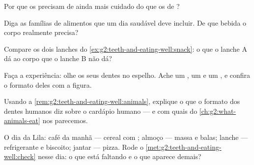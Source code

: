 \begin{exercise}[$\star$]\label{exo:g2:teeth-and-eating-well:5}
Por que os  precisam de ainda mais cuidado do que os
de ?
\end{exercise}

\begin{exercise}[$\star$]\label{exo:g2:teeth-and-eating-well:6}
Diga as famílias de alimentos que um dia saudável deve incluir. De
que bebida o corpo realmente precisa?
\end{exercise}

\begin{exercise}[$\star$]\label{exo:g2:teeth-and-eating-well:7}
Compare os dois lanches do \cref{ex:g2:teeth-and-eating-well:snack}:
o que o lanche A dá ao corpo que o lanche B não dá?
\end{exercise}

\begin{exercise}[$\star$]\label{exo:g2:teeth-and-eating-well:8}
Faça a experiência: olhe os seus dentes no espelho. Ache um
, um  e um , e confira o formato deles com a
figura.
\end{exercise}

\begin{exercise}[$\star\star$]\label{exo:g2:teeth-and-eating-well:9}
Usando a \cref{rem:g2:teeth-and-eating-well:animals}, explique o que
o formato dos dentes humanos diz sobre o cardápio humano --- e com
quais  do \cref{ch:g2:what-animals-eat} nos parecemos.
\end{exercise}

\begin{exercise}[$\star\star$]\label{exo:g2:teeth-and-eating-well:10}
O dia da Lila: café da manhã --- cereal com ; almoço --- massa
e balas; lanche --- refrigerante e biscoito; jantar --- pizza. Rode
o \cref{met:g2:teeth-and-eating-well:check} nesse dia: o que está
faltando e o que aparece demais?
\end{exercise}
